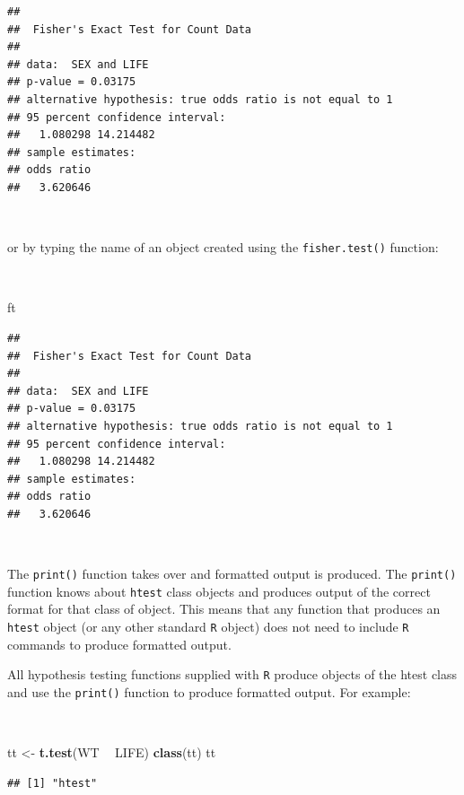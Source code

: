 \documentclass[12pt,a4paper]{book}
\newenvironment{Shaded}{\begin{snugshade}}{\end{snugshade}}
\newcommand{\KeywordTok}[1]{\textcolor[rgb]{0.13,0.29,0.53}{\textbf{#1}}}
\newcommand{\StringTok}[1]{\textcolor[rgb]{0.31,0.60,0.02}{#1}}
\newcommand{\OperatorTok}[1]{\textcolor[rgb]{0.81,0.36,0.00}{\textbf{#1}}}
\newcommand{\NormalTok}[1]{#1}
\theoremstyle{definition}
\theoremstyle{definition}
\theoremstyle{definition}
\theoremstyle{remark}
\begin{document}
\begin{verbatim}
## 
##  Fisher's Exact Test for Count Data
## 
## data:  SEX and LIFE
## p-value = 0.03175
## alternative hypothesis: true odds ratio is not equal to 1
## 95 percent confidence interval:
##   1.080298 14.214482
## sample estimates:
## odds ratio 
##   3.620646
\end{verbatim}

~

or by typing the name of an object created using the
\texttt{fisher.test()} function:

~

\begin{Shaded}
\begin{Highlighting}[]
\NormalTok{ft}
\end{Highlighting}
\end{Shaded}

\begin{verbatim}
## 
##  Fisher's Exact Test for Count Data
## 
## data:  SEX and LIFE
## p-value = 0.03175
## alternative hypothesis: true odds ratio is not equal to 1
## 95 percent confidence interval:
##   1.080298 14.214482
## sample estimates:
## odds ratio 
##   3.620646
\end{verbatim}

~

The \texttt{print()} function takes over and formatted output is
produced. The \texttt{print()} function knows about \texttt{htest} class
objects and produces output of the correct format for that class of
object. This means that any function that produces an \texttt{htest}
object (or any other standard \texttt{R} object) does not need to
include \texttt{R} commands to produce formatted output.

All hypothesis testing functions supplied with \texttt{R} produce
objects of the htest class and use the \texttt{print()} function to
produce formatted output. For example:

~

\begin{Shaded}
\begin{Highlighting}[]
\NormalTok{tt <-}\StringTok{ }\KeywordTok{t.test}\NormalTok{(WT }\OperatorTok{~}\StringTok{ }\NormalTok{LIFE)}
\KeywordTok{class}\NormalTok{(tt)}
\NormalTok{tt}
\end{Highlighting}
\end{Shaded}

\begin{verbatim}
## [1] "htest"
\end{verbatim}
\end{document}
